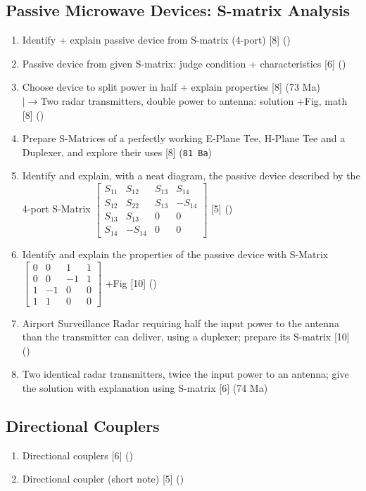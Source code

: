 \documentclass[12pt]{article}
\newcommand{\lb}{\\$\left|\rightarrow\right.$}
\begin{document}
  \subsection{Passive Microwave Devices: S-matrix Analysis}
    \begin{enumerate}[topsep=0pt, noitemsep]
      \item Identify + explain passive device from S-matrix (4-port) \hfill [8] ()
      \item Passive device from given S-matrix: judge condition + characteristics \hfill [6] ()
      \item Choose device to split power in half + explain properties \hfill [8] (73 Ma)
        \lb Two radar transmitters, double power to antenna: solution +Fig, math \hfill [8] ()
      \item Prepare S-Matrices of a perfectly working E-Plane Tee, H-Plane Tee and a Duplexer, and explore their uses \hfill [8] (\texttt{81 Ba})
      \item Identify and explain, with a neat diagram, the passive device described by the 4-port S-Matrix $\begin{bmatrix}S_{11}&S_{12}&S_{13}&S_{14}\\ S_{12}&S_{22}&S_{13}&-S_{14}\\ S_{13}&S_{13}&0&0\\ S_{14}&-S_{14}&0&0\end{bmatrix}$ \hfill [5] ()
      \item Identify and explain the properties of the passive device with S-Matrix $\begin{bmatrix}0&0&1&1\\ 0&0&-1&1\\ 1&-1&0&0\\ 1&1&0&0\end{bmatrix}$ +Fig \hfill [10] ()
      \item Airport Surveillance Radar requiring half the input power to the antenna than the transmitter can deliver, using a duplexer; prepare its S-matrix \hfill [10] ()
      \item Two identical radar transmitters, twice the input power to an antenna; give the solution with explanation using S-matrix \hfill [6] (74 Ma)
    \end{enumerate}

  \subsection{Directional Couplers}
    \begin{enumerate}[topsep=0pt, noitemsep]
      \item Directional couplers \hfill [6] ()
      \item Directional coupler (short note) \hfill [5] ()
    \end{enumerate}
\end{document}
